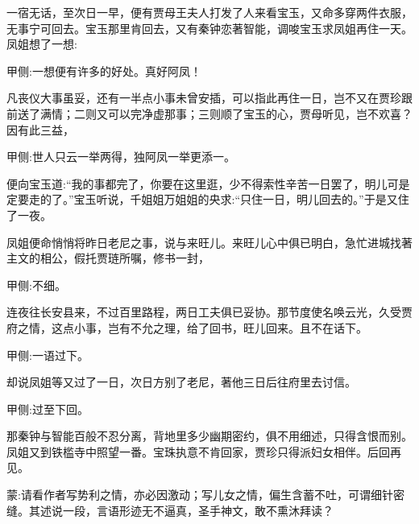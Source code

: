 \begin{parag}
    一宿无话，至次日一早，便有贾母王夫人打发了人来看宝玉，又命多穿两件衣服，无事宁可回去。宝玉那里肯回去，又有秦钟恋著智能，调唆宝玉求凤姐再住一天。凤姐想了一想:\begin{note}甲侧:一想便有许多的好处。真好阿凤！\end{note}凡丧仪大事虽妥，还有一半点小事未曾安插，可以指此再住一日，岂不又在贾珍跟前送了满情；二则又可以完净虚那事；三则顺了宝玉的心，贾母听见，岂不欢喜？因有此三益，\begin{note}甲侧:世人只云一举两得，独阿凤一举更添一。\end{note}便向宝玉道:“我的事都完了，你要在这里逛，少不得索性辛苦一日罢了，明儿可是定要走的了。”宝玉听说，千姐姐万姐姐的央求:“只住一日，明儿回去的。”于是又住了一夜。
\end{parag}


\begin{parag}
    凤姐便命悄悄将昨日老尼之事，说与来旺儿。来旺儿心中俱已明白，急忙进城找著主文的相公，假托贾琏所嘱，修书一封，\begin{note}甲侧:不细。\end{note}连夜往长安县来，不过百里路程，两日工夫俱已妥协。那节度使名唤云光，久受贾府之情，这点小事，岂有不允之理，给了回书，旺儿回来。且不在话下。\begin{note}甲侧:一语过下。\end{note}
\end{parag}


\begin{parag}
    却说凤姐等又过了一日，次日方别了老尼，著他三日后往府里去讨信。\begin{note}甲侧:过至下回。\end{note}那秦钟与智能百般不忍分离，背地里多少幽期密约，俱不用细述，只得含恨而别。凤姐又到铁槛寺中照望一番。宝珠执意不肯回家，贾珍只得派妇女相伴。后回再见。
\end{parag}


\begin{parag}
    \begin{note}蒙:请看作者写势利之情，亦必因激动；写儿女之情，偏生含蓄不吐，可谓细针密缝。其述说一段，言语形迹无不逼真，圣手神文，敢不熏沐拜读？\end{note}
\end{parag}